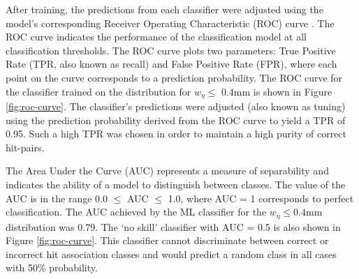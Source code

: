After training, the predictions from each classifier were adjusted using the model's corresponding Receiver Operating Characteristic (ROC) curve \cite{Davis2006-oh}. The ROC curve indicates the performance of the classification model at all classification thresholds. The ROC curve plots two parameters: True Positive Rate (TPR, also known as recall) and False Positive Rate (FPR), where each point on the curve corresponds to a prediction probability. The ROC curve for the classifier trained on the distribution for $w_{\eta} \le$ 0.4mm is shown in Figure \ref{fig:roc-curve}. The classifier’s predictions were adjusted (also known as tuning) using the prediction probability derived from the ROC curve to yield a TPR of 0.95. Such a high TPR was chosen in order to maintain a high purity of correct hit-pairs. 

The Area Under the Curve (AUC) represents a measure of separability and indicates the ability of a model to distinguish between classes. The value of the AUC is in the range 0.0 $\leq$ AUC $\leq$ 1.0, where AUC = 1 corresponds to perfect classification. The AUC achieved by the ML classifier for the $w_{\eta} \leq 0.4$mm distribution was 0.79. The ‘no skill’ classifier with AUC = 0.5 is also shown in Figure \ref{fig:roc-curve}. This classifier cannot discriminate between correct or incorrect hit association classes and would predict a random class in all cases with 50\% probability.


